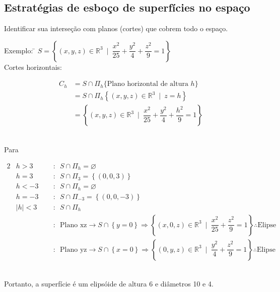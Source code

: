 \documentclass{article}
\begin{document}
\subsection{Estratégias de esboço de superfícies no espaço}
Identificar sua interseção com planos (cortes) que cobrem todo o espaço. \\[-10pt]
\begin{tabbing}
  Exemplo: \= $S = \left\{ (x, y, z) \in \mathbb{R}^3 \enspace \bigg| \enspace \dfrac{x^2}{25} + \dfrac{y^2}{4} + \dfrac{z^2}{9} = 1 \right\}$ \\[5pt]
  \> Cortes horizontais: \\[-5pt]
  \>\begin{minipage}{.5 \textwidth}
    \begin{align*}
      C_h &= S \cap \Pi_h\{ \text{Plano horizontal de altura $h$} \} \\
      &= S \cap \Pi_h\left\{ (x, y, z) \in \mathbb{R}^3 \enspace \big| \enspace z = h \right\} \\
      &= \left\{ (x, y, z) \in \mathbb{R}^3 \enspace \bigg| \enspace \dfrac{x^2}{25} + \dfrac{y^2}{4} + \dfrac{h^2}{9} = 1 \right\}
    \end{align*}
  \end{minipage}\\
  \> Para\\[-10pt]
  \>\quad\begin{minipage}{.35 \textwidth}
    \begin{alignat*}{2}
      &h > 3   \enspace &&: \enspace S \cap \Pi_h = \varnothing \\[5pt]
      &h = 3   \enspace &&: \enspace S \cap \Pi_3 = \left\{ (0,0,3) \right\} \\[5pt]
      &h < -3  \enspace &&: \enspace S \cap \Pi_h = \varnothing \\[5pt]
      &h = -3  \enspace &&: \enspace S \cap \Pi_{-3} = \left\{ (0,0,-3) \right\} \\[5pt]
      &|h| < 3 \enspace &&: \enspace S \cap \Pi_h \\[-5pt]
      & &&: \enspace \text{Plano xz} \rightarrow S \cap \left\{ y = 0 \right\} \Rightarrow \left\{ (x, 0, z) \in \mathbb{R}^3 \enspace \bigg| \enspace \dfrac{x^2}{25} + \dfrac{z^2}{9} = 1 \right\} \therefore \text{Elipse} \\
      & &&: \enspace \text{Plano yz} \rightarrow S \cap \left\{ x = 0 \right\} \Rightarrow \left\{ (0, y, z) \in \mathbb{R}^3 \enspace \bigg| \enspace \dfrac{y^2}{4} + \dfrac{z^2}{9} = 1 \right\} \therefore \text{Elipse}
    \end{alignat*}
  \end{minipage}\\[10pt]
  \> Portanto, a superfície é um elipsóide de altura 6 e diâmetros 10 e 4.
\end{tabbing}
\end{document}

